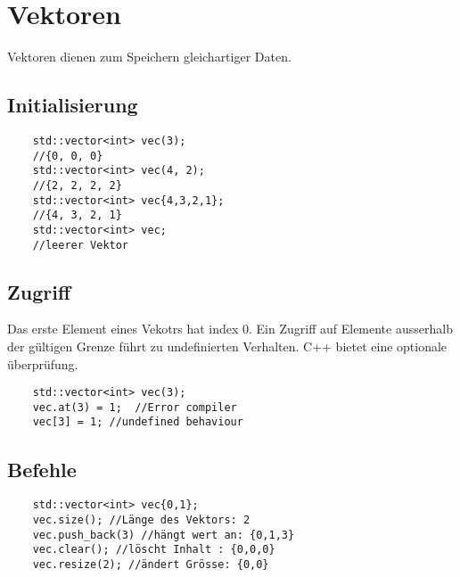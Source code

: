 \section{Vektoren} 
Vektoren dienen zum Speichern gleichartiger Daten.
\subsection{Initialisierung}
\begin{lstlisting}
	std::vector<int> vec(3);
	//{0, 0, 0}
	std::vector<int> vec(4, 2);
	//{2, 2, 2, 2}
	std::vector<int> vec{4,3,2,1};
	//{4, 3, 2, 1}
	std::vector<int> vec;
	//leerer Vektor
\end{lstlisting}
\subsection{Zugriff}
Das erste Element eines Vekotrs hat index 0. Ein Zugriff auf Elemente ausserhalb der gültigen Grenze führt zu undefinierten Verhalten. C++ bietet eine optionale überprüfung.
\begin{lstlisting}
	std::vector<int> vec(3);
	vec.at(3) = 1;	//Error compiler
	vec[3] = 1; //undefined behaviour
\end{lstlisting}
\subsection{Befehle}
\begin{lstlisting}
	std::vector<int> vec{0,1};
	vec.size(); //Länge des Vektors: 2
	vec.push_back(3) //hängt wert an: {0,1,3}
	vec.clear(); //löscht Inhalt : {0,0,0}
	vec.resize(2); //ändert Grösse: {0,0}
\end{lstlisting}





